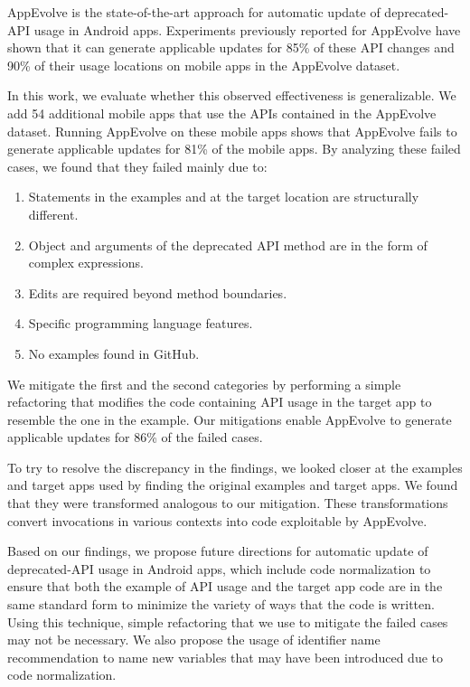 AppEvolve is the state-of-the-art approach for automatic update of
deprecated-API usage in Android apps. Experiments previously reported for
AppEvolve have shown that it can generate applicable updates for
85\% of these API
changes and 90\% of their usage locations on mobile apps in the
AppEvolve dataset.

In this work, we evaluate whether this observed effectiveness is
generalizable. We add 54 additional mobile apps that use the APIs contained
in the AppEvolve dataset. Running AppEvolve on these mobile apps shows that
AppEvolve fails to generate applicable updates for 81\% of the mobile
apps. By analyzing these failed cases, we found that they failed mainly
due to:
\begin{enumerate}
    \item Statements in the examples and at the target location are structurally different.
    \item Object and arguments of the deprecated API method are in the form of complex expressions.
    \item Edits are required beyond method boundaries.
    \item Specific programming language features.
    \item No examples found in GitHub.
\end{enumerate}
We mitigate the first and the second categories by performing a simple
refactoring that modifies the code containing API usage in the target app
to resemble the one in the example. Our mitigations enable AppEvolve
to generate applicable updates for 86\% of the failed cases.

To try to resolve the discrepancy in the findings, we looked closer at the
examples and target apps used by finding the original examples and target
apps. We found that they were transformed analogous to our mitigation.
These transformations convert invocations in various contexts into code
exploitable by AppEvolve.

Based on our findings, we propose future directions for automatic update of
deprecated-API usage in Android apps, which include code normalization to
ensure that both the example of API usage and the target app code are in
the same standard form to minimize the variety of ways that the code is
written. Using this technique, simple refactoring that we use to mitigate
the failed cases may not be necessary. We also propose the usage of
identifier name recommendation to name new variables that may have been
introduced due to code normalization.
